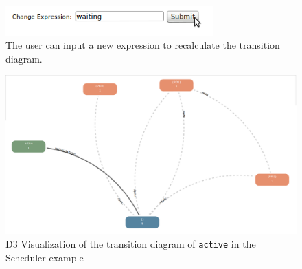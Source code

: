 \begin{center}
\begin{figure}[h!]
\centering
\includegraphics[width=8cm]{bilder/transDiag-UI.png}
\caption{The user can input a new expression to recalculate the transition diagram.}
\label{transDiagUI}
\end{figure}
\end{center}


\begin{center}
\begin{figure}[h!]
\centering
\includegraphics[width=14cm]{bilder/transdiag.png}
\caption{D3 Visualization of the transition diagram of \texttt{active} in the Scheduler example}
\label{transdiag}
\end{figure}
\end{center} 

\pagebreak

